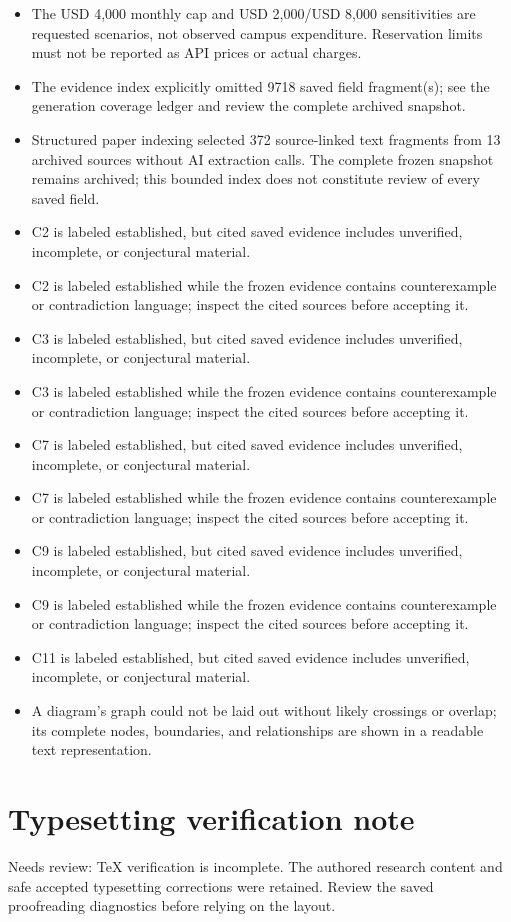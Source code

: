 \documentclass[11pt]{article}
\begin{document}
\begin{itemize}
\item The USD 4,000 monthly cap and USD 2,000/USD 8,000 sensitivities are requested scenarios, not observed campus expenditure. Reservation limits must not be reported as API prices or actual charges.
\item The evidence index explicitly omitted 9718 saved field fragment(s); see the generation coverage ledger and review the complete archived snapshot.
\item Structured paper indexing selected 372 source-linked text fragments from 13 archived sources without AI extraction calls. The complete frozen snapshot remains archived; this bounded index does not constitute review of every saved field.
\item C2 is labeled established, but cited saved evidence includes unverified, incomplete, or conjectural material.
\item C2 is labeled established while the frozen evidence contains counterexample or contradiction language; inspect the cited sources before accepting it.
\item C3 is labeled established, but cited saved evidence includes unverified, incomplete, or conjectural material.
\item C3 is labeled established while the frozen evidence contains counterexample or contradiction language; inspect the cited sources before accepting it.
\item C7 is labeled established, but cited saved evidence includes unverified, incomplete, or conjectural material.
\item C7 is labeled established while the frozen evidence contains counterexample or contradiction language; inspect the cited sources before accepting it.
\item C9 is labeled established, but cited saved evidence includes unverified, incomplete, or conjectural material.
\item C9 is labeled established while the frozen evidence contains counterexample or contradiction language; inspect the cited sources before accepting it.
\item C11 is labeled established, but cited saved evidence includes unverified, incomplete, or conjectural material.
\item A diagram's graph could not be laid out without likely crossings or overlap; its complete nodes, boundaries, and relationships are shown in a readable text representation.
\end{itemize}
\section*{Typesetting verification note}
Needs review: TeX verification is incomplete. The authored research content and safe accepted typesetting corrections were retained. Review the saved proofreading diagnostics before relying on the layout.
\end{document}
